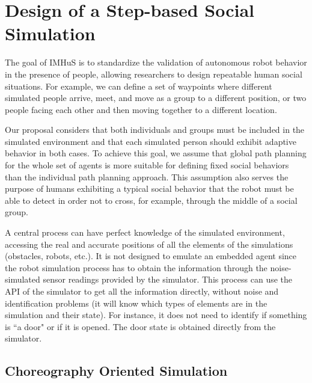 \section{Design of a Step-based Social Simulation}
\label{sec:design}

The goal of IMHuS is to standardize the validation of autonomous robot behavior in the presence of people, allowing researchers to design repeatable human social situations. For example, we can define a set of waypoints where different simulated people arrive, meet, and move as a group to a different position, or two people facing each other and then moving together to a different location.

Our proposal considers that both individuals and groups must be included in the simulated environment and that each simulated person should exhibit adaptive behavior in both cases. To achieve this goal, we assume that global path planning for the whole set of agents is more suitable for defining fixed social behaviors than the individual path planning approach. This assumption also serves the purpose of humans exhibiting a typical social behavior that the robot must be able to detect in order not to cross, for example, through the middle of a social group.

A central process can have perfect knowledge of the simulated environment, accessing the real and accurate positions of all the elements of the simulations (obstacles, robots, etc.). It is not designed to emulate an embedded agent since the robot simulation process has to obtain the information through the noise-simulated sensor readings provided by the simulator. This process can use the API of the simulator to get all the information directly, without noise and identification problems (it will know which types of elements are in the simulation and their state). For instance, it does not need to identify if something is ``a door" or if it is opened. The door state is obtained directly from the simulator.


\subsection{Choreography Oriented Simulation}

